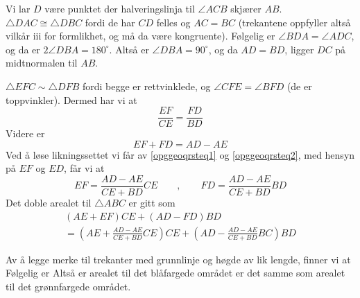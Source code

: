 





\footnotesize
\opgt 	

Vi lar $ D $ være punktet der halveringslinja til $ \angle ACB $ skjærer $ AB $. $ \triangle DAC\cong \triangle DBC $ fordi de har $ CD $ felles og $ AC=BC $ (trekantene oppfyller altså vilkår iii for formlikhet, og må da være kongruente). Følgelig er $ \angle BDA=\angle ADC $, og da er $ 2\angle DBA=180^\circ $. Altså er $ \angle DBA=90^\circ $, og da $ AD=BD $, ligger $ DC $ på midtnormalen til $ AB $.

$ {\triangle EFC \sim \triangle DFB} $ fordi begge er rettvinklede, og $ {\angle CFE = \angle BFD}$ (de er toppvinkler). Dermed har vi at
\begin{equation}\label{opggeoqrsteq1}
	\frac{EF}{CE}=\frac{FD}{BD} 
\end{equation}
Videre er
\begin{equation}\label{opggeoqrsteq2}
	EF+FD= AD-AE
\end{equation}
Ved å løse likningssettet vi får av \eqref{opggeoqrsteq1} og \eqref{opggeoqrsteq2}, med hensyn på $ EF $ og $ ED $, får vi at
\[ 
EF = \frac{AD-AE}{CE+BD}CE\qquad,\qquad  FD=\frac{AD-AE}{CE+BD}BD
\]
Det doble arealet til $ \triangle ABC $ er gitt som
\begin{multline*}
(AE+EF)CE+(AD-FD)BD \\=\left(AE+\frac{AD-AE}{CE+BD}CE\right)CE+\left(AD-\frac{AD-AE}{CE+BD}BC\right)BD	
\end{multline*}

\newpage
{}
Av å legge merke til trekanter med grunnlinje og høgde av lik lengde, finner vi at
Følgelig er
Altså er arealet til det blåfargede området er det samme som arealet til det grønnfargede området.
\newpage


